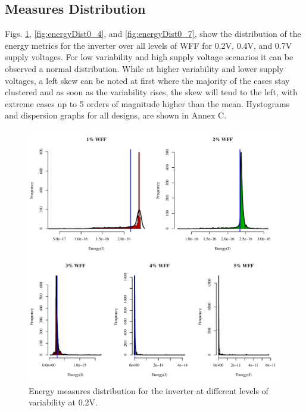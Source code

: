 \documentclass[pgmicro,mestrado,english]{iiufrgs}
\begin{document}
\subsection{Measures Distribution}
    Figs. \ref{fig:energyDist0_2}, \ref{fig:energyDist0_4}, and \ref{fig:energyDist0_7}, show the distribution of the energy metrics for the inverter over all levels of WFF for 0.2V, 0.4V, and 0.7V supply voltages. For low variability and high supply voltage scenarios it can be observed a normal distribution. While at higher variability and lower supply voltages, a left skew can be noted at first where the majority of the cases stay clustered and as soon as the variability rises, the skew will tend to the left, with extreme cases up to 5 orders of magnitude higher than the mean. Hystograms and dispersion graphs for all designs, are shown in Annex C.

     \begin{figure}[]
        \centering
            \includegraphics[width=1\textwidth, trim={0cm 0cm 0cm 0cm}, clip]{dist_energy_INV_0_2.pdf}
            \caption{Energy measures distribution for the inverter at different levels of variability at 0.2V.}
        \label{fig:energyDist0_2}
    \end{figure}
\end{document}
